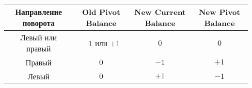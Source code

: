 \begin{table*}[ht]
    \centering

    \begin{tabular}{|c|c|c|c|}
        \hline
        Направление поворота & Old Pivot Balance & New Current Balance & New Pivot Balance \\
        \hline
            Левый или правый &   $-1$ или $+1$   &         $0$         &        $0$        \\
        \hline
                      Правый &        $0$        &         $-1$        &        $+1$       \\
        \hline
                       Левый &        $0$        &         $+1$        &        $-1$       \\
        \hline
    \end{tabular}

\end{table*}